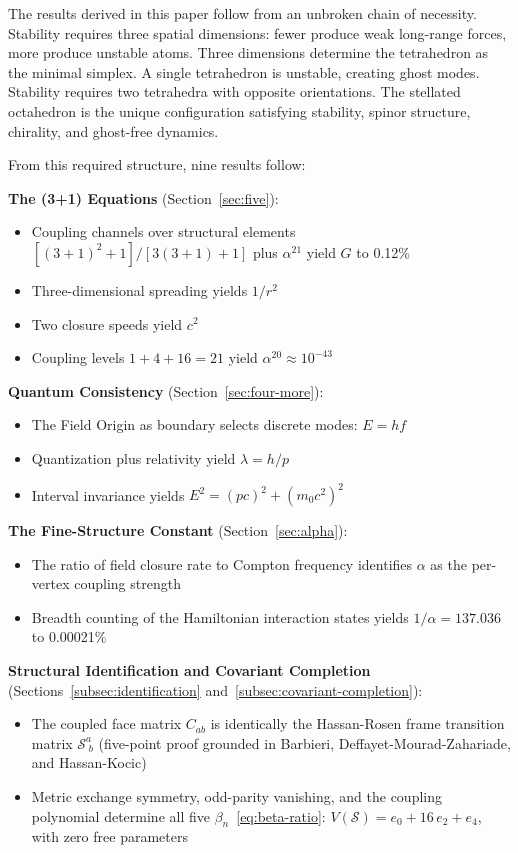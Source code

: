 \documentclass[aps,prd,preprint,superscriptaddress,showpacs,preprintnumbers,amsmath,amssymb,nofootinbib]{revtex4-2}
\begin{document}
The results derived in this paper follow from an unbroken chain of necessity. Stability requires three spatial dimensions: fewer produce weak long-range forces, more produce unstable atoms. Three dimensions determine the tetrahedron as the minimal simplex. A single tetrahedron is unstable, creating ghost modes. Stability requires two tetrahedra with opposite orientations. The stellated octahedron is the unique configuration satisfying stability, spinor structure, chirality, and ghost-free dynamics.

From this required structure, nine results follow:

\textbf{The (3+1) Equations} (Section~\ref{sec:five}):
\begin{itemize}
\item Coupling channels over structural elements $[(3+1)^2+1]/[3(3+1)+1]$ plus $\alpha^{21}$ yield $G$ to 0.12\%
\item Three-dimensional spreading yields $1/r^2$
\item Two closure speeds yield $c^2$
\item Coupling levels $1 + 4 + 16 = 21$ yield $\alpha^{20} \approx 10^{-43}$
\end{itemize}

\textbf{Quantum Consistency} (Section~\ref{sec:four-more}):
\begin{itemize}
\item The Field Origin as boundary selects discrete modes: $E = hf$
\item Quantization plus relativity yield $\lambda = h/p$
\item Interval invariance yields $E^2 = (pc)^2 + (m_0 c^2)^2$
\end{itemize}

\textbf{The Fine-Structure Constant} (Section~\ref{sec:alpha}):
\begin{itemize}
\item The ratio of field closure rate to Compton frequency identifies $\alpha$ as the per-vertex coupling strength
\item Breadth counting of the Hamiltonian interaction states yields $1/\alpha = 137.036$ to 0.00021\%
\end{itemize}

\textbf{Structural Identification and Covariant Completion} (Sections~\ref{subsec:identification} and~\ref{subsec:covariant-completion}):
\begin{itemize}
\item The coupled face matrix $C_{ab}$ is identically the Hassan-Rosen frame transition matrix $\mathcal{S}^a_{\;b}$ (five-point proof grounded in Barbieri, Deffayet-Mourad-Zahariade, and Hassan-Kocic)
\item Metric exchange symmetry, odd-parity vanishing, and the coupling polynomial determine all five $\beta_n$~\eqref{eq:beta-ratio}: $V(\mathcal{S}) = e_0 + 16\,e_2 + e_4$, with zero free parameters
\end{itemize}
\end{document}
